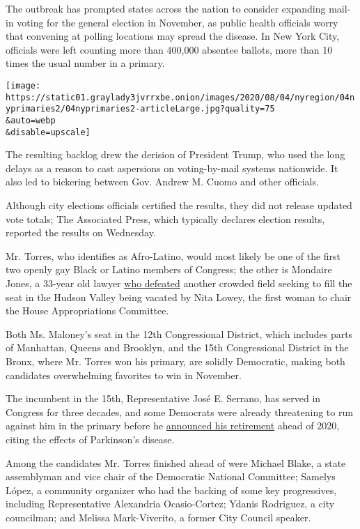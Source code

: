 The outbreak has prompted states across the nation to consider expanding
mail-in voting for the general election in November, as public health
officials worry that convening at polling locations may spread the
disease. In New York City, officials were left counting more than
400,000 absentee ballots, more than 10 times the usual number in a
primary.

\texttt{[image: https://static01.graylady3jvrrxbe.onion/images/2020/08/04/nyregion/04nyprimaries2/04nyprimaries2-articleLarge.jpg?quality=75\\\&auto=webp\\\&disable=upscale]}

The resulting backlog drew the derision of President Trump, who used the
long delays as a reason to cast aspersions on voting-by-mail systems
nationwide. It also led to bickering between Gov. Andrew M. Cuomo and
other officials.

Although city elections officials certified the results, they did not
release updated vote totals; The Associated Press, which typically
declares election results, reported the results on Wednesday.

Mr. Torres, who identifies as Afro-Latino, would most likely be one of
the first two openly gay Black or Latino members of Congress; the other
is Mondaire Jones, a 33-year old lawyer
\href{https://www.nytimes3xbfgragh.onion/2020/07/14/nyregion/mondaire-jones-house-primary.html}{who
defeated} another crowded field seeking to fill the seat in the Hudson
Valley being vacated by Nita Lowey, the first woman to chair the House
Appropriations Committee.

Both Ms. Maloney's seat in the 12th Congressional District, which
includes parts of Manhattan, Queens and Brooklyn, and the 15th
Congressional District in the Bronx, where Mr. Torres won his primary,
are solidly Democratic, making both candidates overwhelming favorites to
win in November.

The incumbent in the 15th, Representative José E. Serrano, has served in
Congress for three decades, and some Democrats were already threatening
to run against him in the primary before he
\href{https://www.nytimes3xbfgragh.onion/2019/03/25/nyregion/jose-serrano-parkinsons-retire.html}{announced
his retirement} ahead of 2020, citing the effects of Parkinson's
disease.

Among the candidates Mr. Torres finished ahead of were Michael Blake, a
state assemblyman and vice chair of the Democratic National Committee;
Samelys López, a community organizer who had the backing of some key
progressives, including Representative Alexandria Ocasio-Cortez; Ydanis
Rodriguez, a city councilman; and Melissa Mark-Viverito, a former City
Council speaker.

